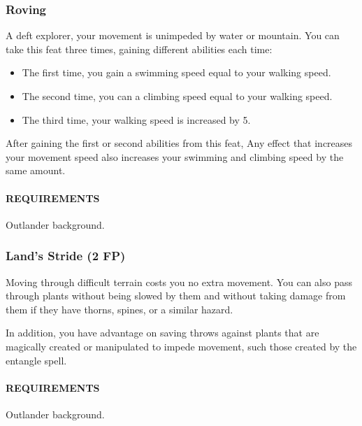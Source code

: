     \subsubsection{Roving} \label{feat::roving}
        A deft explorer, your movement is unimpeded by water or mountain.
        You can take this feat three times, gaining different abilities each time:
        \begin{itemize}
            \item The first time, you gain a swimming speed equal to your walking speed.
            \item The second time, you can a climbing speed equal to your walking speed.
            \item The third time, your walking speed is increased by 5.
        \end{itemize}
        After gaining the first or second abilities from this feat, Any effect that increases your movement speed also increases your swimming and climbing speed by the same amount.
        \paragraph{REQUIREMENTS} Outlander background.

    \subsubsection{Land's Stride (2 FP)} \label{feat::landsstride}
        Moving through difficult terrain costs you no extra movement.
        You can also pass through plants without being slowed by them and without taking damage from them if they have thorns, spines, or a similar hazard.

        In addition, you have advantage on saving throws against plants that are magically created or manipulated to impede movement, such those created by the entangle spell.
        \paragraph{REQUIREMENTS} Outlander background.


